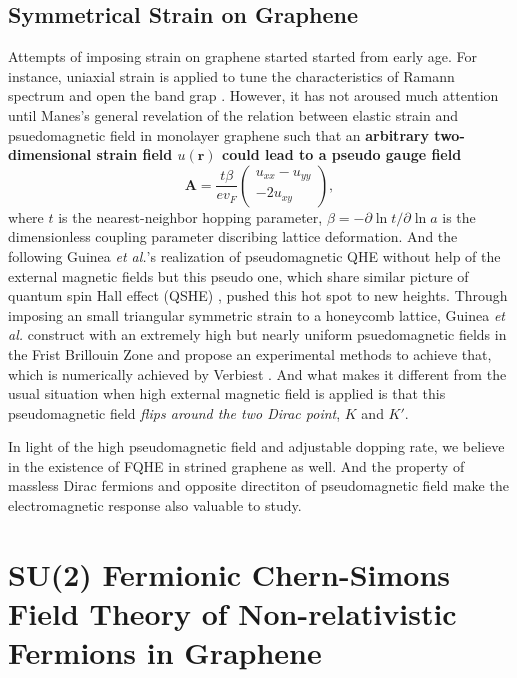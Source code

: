 \documentclass[bachelor,english,numbers]{ustcthesis}
\begin{document}
	\section{Symmetrical Strain on Graphene}
		\indent\par Attempts of imposing strain on graphene started started from early age. For instance, uniaxial strain is applied to tune the characteristics of Ramann spectrum and open the band grap \cite{ni2008uniaxial,farjam2009comment}. However, it has not aroused much attention until Manes's general revelation of the relation between elastic strain and psuedomagnetic field in monolayer graphene \cite{manes2007symmetry} such that an {\bf arbitrary two-dimensional strain field $u(\bm{r})$ could lead to a pseudo gauge field}
		\begin{equation}\label{1.1.1}
			\bm{A}=\dfrac{t\beta}{ev_F}\left(\begin{array}{c}u_{xx}-u_{yy}\\-2u_{xy}\end{array}\right),
		\end{equation}
		where $t$ is the nearest-neighbor hopping parameter, $\beta=-\partial\ln t/\partial\ln a$ is the dimensionless coupling parameter discribing lattice deformation. And the following Guinea {\it et al.}'s realization of pseudomagnetic QHE \cite{guinea2010energy} without help of the external magnetic fields but this pseudo one, which share similar picture of quantum spin Hall effect (QSHE) \cite{bernevig2006quantum}, pushed this hot spot to new heights. Through imposing an small triangular symmetric strain to a honeycomb lattice, Guinea {\it et al.} construct with an extremely high but nearly uniform psuedomagnetic fields in the Frist Brillouin Zone and propose an experimental methods to achieve that, which is numerically achieved by Verbiest \cite{verbiest2015uniformity}. And what makes it different from the usual situation when high external magnetic field is applied is that this pseudomagnetic field \emph{flips around the two Dirac point}, $K$ and $K'$.\par
		In light of the high pseudomagnetic field and adjustable dopping rate, we believe in the existence of FQHE in strined graphene as well. And the property of massless Dirac fermions and opposite directiton of pseudomagnetic field make the electromagnetic response also valuable to study.
		
\chapter{SU(2) Fermionic Chern-Simons Field Theory of Non-relativistic Fermions in Graphene}
\end{document}

